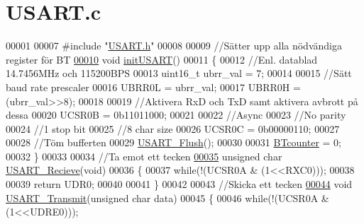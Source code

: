 \hypertarget{_u_s_a_r_t_8c_source}{}\section{U\+S\+A\+R\+T.\+c}
\label{_u_s_a_r_t_8c_source}

\begin{DoxyCode}
00001 
00007 \textcolor{preprocessor}{#include "\hyperlink{_u_s_a_r_t_8h}{USART.h}"}
00008 
00009 \textcolor{comment}{//Sätter upp alla nödvändiga register för BT}
\hypertarget{_u_s_a_r_t_8c_source.tex_l00010}{}\hyperlink{_u_s_a_r_t_8h_a4b46e2e6b871d0b0f138e61760b10fa2}{00010} \textcolor{keywordtype}{void} \hyperlink{_u_s_a_r_t_8c_a4b46e2e6b871d0b0f138e61760b10fa2}{initUSART}()
00011 \{
00012     \textcolor{comment}{//Enl. datablad 14.7456MHz och 115200BPS}
00013     uint16\_t ubrr\_val = 7;
00014     
00015     \textcolor{comment}{//Sätt baud rate prescaler}
00016     UBRR0L = ubrr\_val;
00017     UBRR0H = (ubrr\_val>>8);
00018     
00019     \textcolor{comment}{//Aktivera RxD och TxD samt aktivera avbrott på dessa}
00020     UCSR0B = 0b11011000;
00021     
00022     \textcolor{comment}{//Async}
00023     \textcolor{comment}{//No parity}
00024     \textcolor{comment}{//1 stop bit}
00025     \textcolor{comment}{//8 char size}
00026     UCSR0C = 0b00000110;
00027     
00028     \textcolor{comment}{//Töm bufferten}
00029     \hyperlink{_u_s_a_r_t_8c_a0f33ec0995bf5f267e847d9e22fb596a}{USART\_Flush}();
00030     
00031     \hyperlink{_u_s_a_r_t_8h_ad9497e6b45d71841b52db55c1ef891f6}{BTcounter} = 0;
00032 \}
00033 
00034 \textcolor{comment}{//Ta emot ett tecken}
\hypertarget{_u_s_a_r_t_8c_source.tex_l00035}{}\hyperlink{_u_s_a_r_t_8h_aec32185dd8feec99d38acc7f8ab69197}{00035} \textcolor{keywordtype}{unsigned} \textcolor{keywordtype}{char} \hyperlink{_u_s_a_r_t_8c_abdcbc8bf037debf49ff1c15614a59c50}{USART\_Recieve}(\textcolor{keywordtype}{void})
00036 \{
00037     \textcolor{keywordflow}{while}(!(UCSR0A & (1<<RXC0)));
00038     
00039     \textcolor{keywordflow}{return} UDR0;
00040     
00041 \}
00042 
00043 \textcolor{comment}{//Skicka ett tecken}
\hypertarget{_u_s_a_r_t_8c_source.tex_l00044}{}\hyperlink{_u_s_a_r_t_8h_ab8c416106cf1aff4ccdb3da4860fc179}{00044} \textcolor{keywordtype}{void} \hyperlink{_u_s_a_r_t_8c_ab8c416106cf1aff4ccdb3da4860fc179}{USART\_Transmit}(\textcolor{keywordtype}{unsigned} \textcolor{keywordtype}{char} data)
00045 \{
00046     \textcolor{keywordflow}{while}(!(UCSR0A & (1<<UDRE0)));

\end{DoxyCode}
